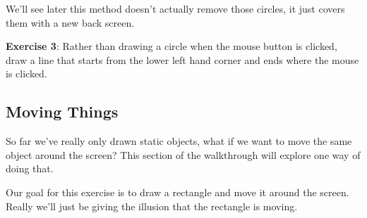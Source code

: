 \documentclass[letterpaper,10pt,english]{sphinxmanual}
\begin{document}
We'll see later this method doesn't actually remove those circles, it just covers them with a new back screen.

\textbf{Exercise 3}: Rather than drawing a circle when the mouse button is clicked, draw a line that starts from the lower left hand corner and ends where the mouse is clicked.


\subsection{Moving Things}
\label{week_3/index:moving-things}
So far we've really only drawn static objects, what if we want to move the same object around the screen? This section of the walkthrough will explore one way of doing that.

Our goal for this exercise is to draw a rectangle and move it around the screen. Really we'll just be giving the illusion that the rectangle is moving.
\end{document}
